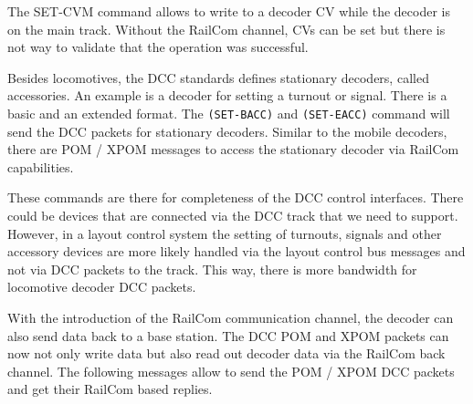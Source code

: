 The SET-CVM command allows to write to a decoder CV while the decoder is on the main track. Without the RailCom channel, CVs can be set but there is not way to validate that the operation was successful.


Besides locomotives, the DCC standards defines stationary decoders, called accessories. An example is a decoder for setting a turnout or signal. There is a basic and an extended format. The \texttt{(SET-BACC)} and \texttt{(SET-EACC)} command will send the DCC packets for stationary decoders. Similar to the mobile decoders, there are POM / XPOM messages to access the stationary decoder via RailCom capabilities.

\begin{table}[ht!]
    \centering 
\end{table}

These commands are there for completeness of the DCC control interfaces. There could be devices that are connected via the DCC track that we need to support. However, in a layout control system the setting of turnouts, signals and other accessory devices are more likely handled via the layout control bus messages and not via DCC packets to the track. This way, there is more bandwidth for locomotive decoder DCC packets.


With the introduction of the RailCom communication channel, the decoder can also send data back to a base station. The DCC POM and XPOM packets can now not only write data but also read out decoder data via the RailCom back channel. The following messages allow to send the POM / XPOM DCC packets and get their RailCom based replies.

